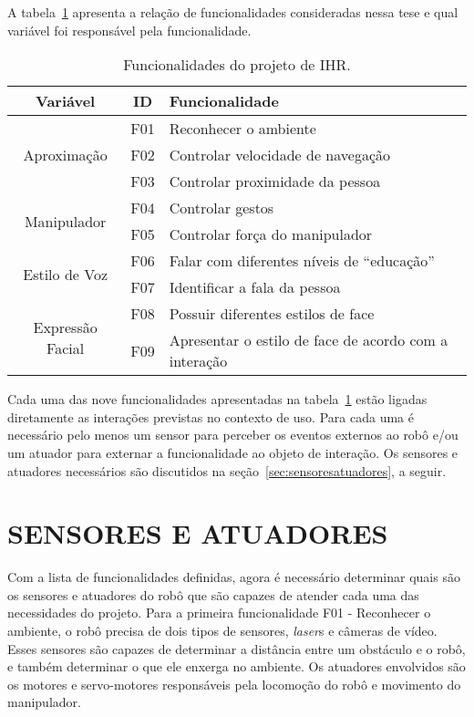 A tabela~\ref{tab:funcionalidades} apresenta a relação de funcionalidades consideradas nessa tese e qual variável foi responsável pela funcionalidade.

\begin{table}[!ht]
	\caption{Funcionalidades do projeto de IHR.}
	\label{tab:funcionalidades}
	\centering
	\begin{tabular}{c | c | l}
        \hline
        Variável & ID & Funcionalidade \\
        \hline
		\multirow{3}{*}{Aproximação} & F01 & Reconhecer o ambiente \\
        \hhline{~--}
        & F02 & Controlar velocidade de navegação \\
        \hhline{~--}
        & F03 & Controlar proximidade da pessoa \\
        \hline
		\multirow{2}{*}{Manipulador} & F04 & Controlar gestos \\
        \hhline{~--}
        & F05 & Controlar força do manipulador \\
        \hline
		\multirow{2}{*}{Estilo de Voz} & F06 & Falar com diferentes níveis de ``educação'' \\
        \hhline{~--}
        & F07 & Identificar a fala da pessoa \\
        \hline
		\multirow{2}{*}{Expressão Facial} & F08 & Possuir diferentes estilos de face \\
		\hhline{~--}
		& F09 & Apresentar o estilo de face de acordo com a interação \\
		\hline
	\end{tabular}
\end{table}

Cada uma das nove funcionalidades apresentadas na tabela~\ref{tab:funcionalidades} estão ligadas diretamente as interações previstas no contexto de uso. Para cada uma é necessário pelo menos um sensor para perceber os eventos externos ao robô e/ou um atuador para externar a funcionalidade ao objeto de interação. Os sensores e atuadores necessários são discutidos na seção~\ref{sec:sensoresatuadores}, a seguir.

\section{SENSORES E ATUADORES}
\label{sec:ec_sensoresatuadores}
Com a lista de funcionalidades definidas, agora é necessário determinar quais são os sensores e atuadores do robô que são capazes de atender cada uma das necessidades do projeto. Para a primeira funcionalidade F01 - Reconhecer o ambiente, o robô precisa de dois tipos de sensores, \emph{laser}s e câmeras de vídeo. Esses sensores são capazes de determinar a distância entre um obstáculo e o robô, e também determinar o que ele enxerga no ambiente. Os atuadores envolvidos são os motores e servo-motores responsáveis pela locomoção do robô e movimento do manipulador.

